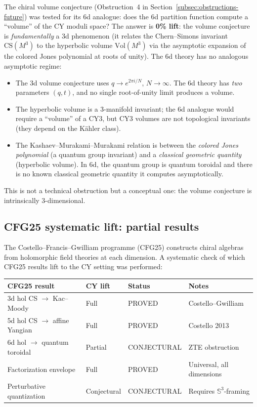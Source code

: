 \documentclass[11pt]{article}
\newcommand{\bS}{\mathbb{S}}
\begin{document}
\begin{warning}
\label{warn:dead-end-volume-6d}
The chiral volume conjecture (Obstruction~4 in
Section~\ref{subsec:obstructions-future}) was tested for its 6d
analogue: does the 6d partition function compute a ``volume'' of the
CY moduli space? The answer is \textbf{0\% lift}: the volume conjecture
is \emph{fundamentally} a 3d phenomenon (it relates the Chern--Simons
invariant $\mathrm{CS}(M^3)$ to the hyperbolic volume $\mathrm{Vol}(M^3)$
via the asymptotic expansion of the colored Jones polynomial at roots
of unity). The 6d theory has no analogous asymptotic regime:
\begin{itemize}
 \item The 3d volume conjecture uses $q \to e^{2\pi i / N}$, $N \to \infty$.
 The 6d theory has \emph{two} parameters $(q, t)$, and no single
 root-of-unity limit produces a volume.
 \item The hyperbolic volume is a 3-manifold invariant; the 6d analogue
 would require a ``volume'' of a CY3, but CY3 volumes are not
 topological invariants (they depend on the K\"ahler class).
 \item The Kashaev--Murakami--Murakami relation is between the
 \emph{colored Jones polynomial} (a quantum group invariant) and a
 \emph{classical geometric quantity} (hyperbolic volume). In 6d, the
 quantum group is quantum toroidal and there is no known classical
 geometric quantity it computes asymptotically.
\end{itemize}
This is not a technical obstruction but a conceptual one: the volume
conjecture is intrinsically 3-dimensional.
\end{warning}

\subsection{CFG25 systematic lift: partial results}
\label{subsec:cfg25-lift}

The Costello--Francis--Gwilliam programme (CFG25) constructs chiral
algebras from holomorphic field theories at each dimension. A
systematic check of which CFG25 results lift to the CY setting was
performed:

\begin{center}
\begin{tabular}{@{}llll@{}}
\toprule
CFG25 result & CY lift & Status & Notes \\
\midrule
3d hol CS $\to$ Kac--Moody & Full & PROVED & Costello--Gwilliam \\
5d hol CS $\to$ affine Yangian & Full & PROVED & Costello 2013 \\
6d hol $\to$ quantum toroidal & Partial & CONJECTURAL & ZTE obstruction \\
Factorization envelope & Full & PROVED & Universal, all dimensions \\
Perturbative quantization & Conjectural & CONJECTURAL & Requires $\bS^3$-framing \\
\bottomrule
\end{tabular}
\end{center}
\end{document}
